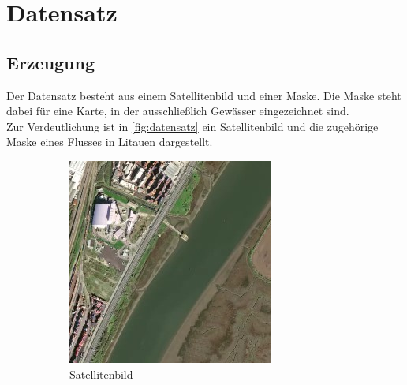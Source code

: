 \section{Datensatz}
\label{sec:datensatz}
\subsection{Erzeugung}
Der Datensatz besteht aus einem Satellitenbild und einer Maske.
Die Maske steht dabei für eine Karte, in der ausschließlich Gewässer eingezeichnet sind.
\\
Zur Verdeutlichung ist in \autoref{fig:datensatz} ein Satellitenbild und die zugehörige Maske eines Flusses in Litauen dargestellt.
\begin{figure}
    \centering
    \begin{subfigure}{0.2\textwidth}
        \centering
        \includegraphics[width=\textwidth]{content/img/datensatz_satellite.jpg}
        \caption{Satellitenbild}
    \end{subfigure}
    \begin{subfigure}{0.2\textwidth}
        \centering

\end{subfigure}
\end{figure}
